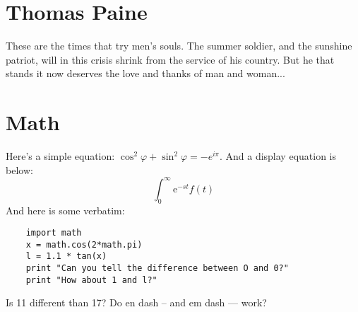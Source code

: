 \documentclass[12pt,letterpaper]{scrartcl}
\newcommand{\laplace}{$$\int_0^\infty \mathup e^{-st}f(t)$$}
\begin{document}
\section{Thomas Paine}
    
    These are the times that try men's souls. The summer soldier, and the sunshine patriot, will in this crisis shrink from the service of his country. But he that stands it now deserves the love and thanks of man and woman...

% 

\section{Math}

Here's a simple equation: $\cos^2 \varphi + \sin^2 \varphi = -e^{i\pi}$. And a display equation is below:
    \laplace
And here is some verbatim:
\begin{lstlisting}
    import math
    x = math.cos(2*math.pi)
    l = 1.1 * tan(x)
    print "Can you tell the difference between O and 0?"
    print "How about 1 and l?"
\end{lstlisting}  

Is 11 different than 17? Do en dash -- and em dash --- work?

    
\end{document}
